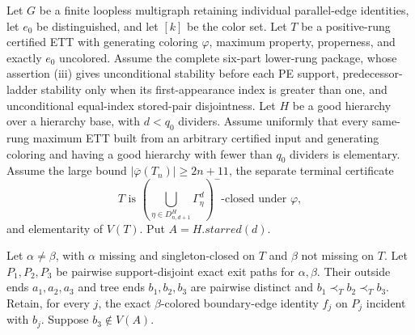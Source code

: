\begin{lemma}
Let $G$ be a finite loopless multigraph retaining individual parallel-edge
identities, let $e_0$ be distinguished, and let $[k]$ be the color set.
Let $T$ be a positive-rung certified ETT with generating coloring
$\varphi$, maximum property, properness, and exactly $e_0$ uncolored.
Assume the complete six-part lower-rung package, whose assertion (iii) gives
unconditional stability before each PE support, predecessor-ladder stability
only when its first-appearance index is greater than one, and unconditional
equal-index stored-pair disjointness.  Let $H$ be a good
hierarchy over a hierarchy base, with $d<q_0$ dividers.  Assume uniformly
that every same-rung maximum ETT built from an arbitrary certified input
and generating coloring and having a good hierarchy with fewer than
$q_0$ dividers is elementary.  Assume the large bound
$|\overline\varphi(T_n)|\geq2n+11$, the separate terminal certificate
\[
 T\text{ is }
 \left(\bigcup_{\eta\in D^H_{n,d+1}}\Gamma^d_\eta\right)^-
 \text{-closed under }\varphi,
\]
and elementarity of $V(T)$.  Put $A=H.\mathit{starred}(d)$.

Let $\alpha\ne\beta$, with $\alpha$ missing and singleton-closed on $T$
and $\beta$ not missing on $T$.  Let $P_1,P_2,P_3$ be pairwise
support-disjoint exact exit paths for $\alpha,\beta$.  Their outside ends
$a_1,a_2,a_3$ and tree ends $b_1,b_2,b_3$ are pairwise distinct and
$b_1\prec_T b_2\prec_T b_3$.  Retain, for every $j$, the exact
$\beta$-colored boundary-edge identity $f_j$ on $P_j$ incident with
$b_j$.  Suppose $b_3\notin V(A)$.


\end{lemma}
